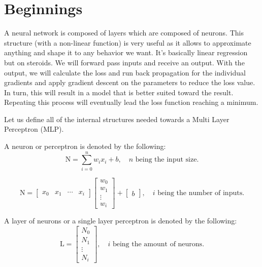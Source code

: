 \section{Beginnings}

A neural network is composed of layers which are composed of neurons. 
This structure (with a non-linear function) is very useful as it allows to approximate anything 
and shape it to any behavior we want. It's basically linear regression but on steroids. 
We will forward pass inputs and receive an output. With the output, we will calculate the loss and
run back propagation for the individual gradients and apply gradient descent on the parameters to reduce the loss value.
In turn, this will result in a model that is better suited toward the result. Repeating this process will
eventually lead the loss function reaching a minimum.

Let us define all of the internal structures needed towards a Multi Layer Perceptron (MLP).

\begin{definition}[Neuron]
    A neuron or perceptron is denoted by the following:
    \begin{equation}
        \text{N} = \sum_{i=0}^{n} w_i x_i + b , \quad n \text{ being the input size.}
    \end{equation}

    \begin{equation}
        \text{N} = 
         \begin{bmatrix}
            x_0 & x_1 & \cdots & x_i 
        \end{bmatrix}
        \begin{bmatrix}
            w_0 \\
            w_1 \\
            \vdots \\
            w_i
        \end{bmatrix}
            +
        \begin{bmatrix}
            b
        \end{bmatrix}, \quad i \text{ being the number of inputs.}
    \end{equation}
\end{definition}

\begin{definition}[Layer]
    A layer of neurons or a single layer perceptron is denoted by the following:
    \begin{equation}
        \text{L} = 
        \begin{bmatrix}
        N_0 \\
        N_1 \\
        \vdots \\
        N_i    
        \end{bmatrix}, \quad i \text{ being the amount of neurons.}
    \end{equation}
\end{definition}

